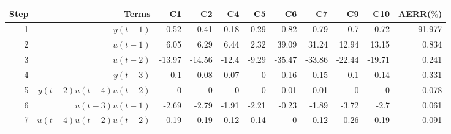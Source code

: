 \begin{tabular}{rrrrrrrrrrr}
Step & Terms & C1 & C2 & C4 & C5 & C6 & C7 & C9 & C10 & AERR($\%$) \\ 
\hline 
1 & $y(t-1)$ & 0.52 & 0.41 & 0.18 & 0.29 & 0.82 & 0.79 & 0.7 & 0.72 & 91.977 \\ 
2 & $u(t-1)$ & 6.05 & 6.29 & 6.44 & 2.32 & 39.09 & 31.24 & 12.94 & 13.15 & 0.834 \\ 
3 & $u(t-2)$ & -13.97 & -14.56 & -12.4 & -9.29 & -35.47 & -33.86 & -22.44 & -19.71 & 0.241 \\ 
4 & $y(t-3)$ & 0.1 & 0.08 & 0.07 & 0 & 0.16 & 0.15 & 0.1 & 0.14 & 0.331 \\ 
5 & $y(t-2)u(t-4)u(t-2)$ & 0 & 0 & 0 & 0 & -0.01 & -0.01 & 0 & 0 & 0.078 \\ 
6 & $u(t-3)u(t-1)$ & -2.69 & -2.79 & -1.91 & -2.21 & -0.23 & -1.89 & -3.72 & -2.7 & 0.061 \\ 
7 & $u(t-4)u(t-2)u(t-2)$ & -0.19 & -0.19 & -0.12 & -0.14 & 0 & -0.12 & -0.26 & -0.19 & 0.091 \\ 
\hline 
\end{tabular}